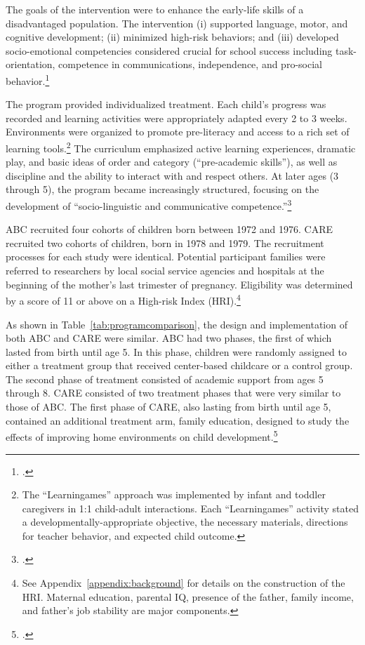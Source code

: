 The goals of the intervention were to enhance the early-life skills of a disadvantaged population. The intervention (i) supported language, motor, and cognitive development; (ii) minimized high-risk behaviors; and (iii) developed socio-emotional competencies considered crucial for school success including task-orientation, competence in communications, independence, and pro-social behavior.\footnote{\citet{Ramey_Collier_etal_1976_CarolinaAbecedarianProject, Ramey_etal_1985_Project-CARE_TiECSE, Sparling_1974_Synth_Edu_Infant_SPEECH, Wasik_Ramey_etal_1990_CD, Ramey-etal_2012-ABC}.}

The program provided individualized treatment. Each child's progress was recorded and learning activities were appropriately adapted every 2 to 3 weeks. Environments were organized to promote pre-literacy and access to a rich set of learning tools.\footnote{The ``Learningames'' approach was implemented by infant and toddler caregivers in 1:1 child-adult interactions. Each ``Learningames'' activity stated a developmentally-appropriate objective, the necessary materials, directions for teacher behavior, and expected child outcome.} The curriculum emphasized active learning experiences, dramatic play, and basic ideas of order and category (``pre-academic skills''), as well as discipline and the ability to interact with and respect others.  At later ages (3 through 5), the program became increasingly structured, focusing on the development of ``socio-linguistic and communicative competence.''\footnote{\citet{Ramey-et-al_1977_Intro-to-ABC, Haskins_1985_CD, Ramey_1981_Modification, Ramey_Campbell_1979_SR, Ramey_Smith_1977_AJMD, Ramey_McGinness_etal_1982_Abecedarianapproach, Sparling_Lewis_1979_BOOKLearninggamesFirstThree,Sparling_Lewis_1984_BOOKLearningGamesThreesFours}.}

ABC recruited four cohorts of children born between 1972 and 1976. CARE recruited two cohorts of children, born in 1978 and 1979. The recruitment processes for each study were identical. Potential participant families were referred to researchers by local social service agencies and hospitals at the beginning of the mother's last trimester of pregnancy. Eligibility was determined by a score of 11 or above on a High-risk Index (HRI).\footnote{See Appendix~\ref{appendix:background} for details on the construction of the HRI. Maternal education, parental IQ, presence of the father, family income, and father's job stability are major components.}

As shown in Table~\ref{tab:programcomparison}, the design and implementation of both ABC and CARE were similar. ABC had two phases, the first of which lasted from birth until age 5. In this phase, children were randomly assigned to either a treatment group that received center-based childcare or a control group. The second phase of treatment consisted of academic support from ages 5 through 8. CARE consisted of two treatment phases that were very similar to those of ABC. The first phase of CARE, also lasting from birth until age 5, contained an additional treatment arm, family education, designed to study the effects of improving home environments on child development.\footnote{\citet{Wasik_Ramey_etal_1990_CD}.}

